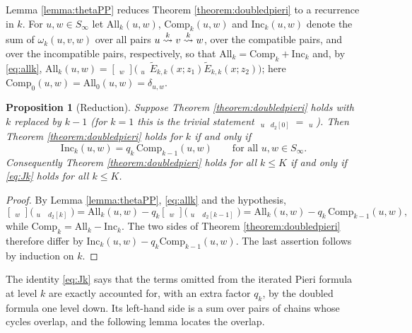 \documentclass{amsart}
\newtheorem{proposition}[lemma]{Proposition}
\theoremstyle{definition}
\theoremstyle{remark}
\numberwithin{equation}{section}
\DeclareMathOperator{\qsch}{\widetilde{\mathfrak{S}}}
\newcommand{\xrightsquigarrow}[2][]{%
	\mathrel{\mathop{\rightsquigarrow}\limits^{\scriptstyle #2}%
	\ifx\hfuzz#1\hfuzz\else_{\scriptstyle #1}\fi}%
}
\newcommand{\tom}[1]{\ensuremath{\xrightsquigarrow{#1}}}
\newcommand{\qelem}{\widetilde{E}}
\begin{document}
Lemma \ref{lemma:thetaPP} reduces Theorem \ref{theorem:doubledpieri} to a recurrence in $k$. For $u,w\in S_\infty$ let $\mathrm{All}_k(u,w)$, $\mathrm{Comp}_k(u,w)$ and $\mathrm{Inc}_k(u,w)$ denote the sum of $\omega_k(u,v,w)$ over all pairs $u\tom{k}v\tom{k}w$, over the compatible pairs, and over the incompatible pairs, respectively, so that $\mathrm{All}_k=\mathrm{Comp}_k+\mathrm{Inc}_k$ and, by \eqref{eq:allk}, $\mathrm{All}_k(u,w)=[\qsch_w]\big(\qsch_u\,\qelem_{k,k}(x;z_1)\qelem_{k,k}(x;z_2)\big)$; here $\mathrm{Comp}_0(u,w)=\mathrm{All}_0(u,w)=\delta_{u,w}$.

\begin{proposition}[Reduction] \label{prop:doubledreduction}
Suppose Theorem \ref{theorem:doubledpieri} holds with $k$ replaced by $k-1$ (for $k=1$ this is the trivial statement $\qsch_u\qsch_{d_2[0]}=\qsch_u$). Then Theorem \ref{theorem:doubledpieri} holds for $k$ if and only if
\begin{equation}\label{eq:Jk}
\mathrm{Inc}_k(u,w)=q_k\,\mathrm{Comp}_{k-1}(u,w)\qquad\text{for all }u,w\in S_\infty.\tag{$\mathrm J_k$}
\end{equation}
Consequently Theorem \ref{theorem:doubledpieri} holds for all $k\leq K$ if and only if \eqref{eq:Jk} holds for all $k\leq K$.
\end{proposition}
\begin{proof}
By Lemma \ref{lemma:thetaPP}, \eqref{eq:allk} and the hypothesis,
$$[\qsch_w]\big(\qsch_u\,\qsch_{d_2[k]}\big)=\mathrm{All}_k(u,w)-q_k[\qsch_w]\big(\qsch_u\,\qsch_{d_2[k-1]}\big)=\mathrm{All}_k(u,w)-q_k\,\mathrm{Comp}_{k-1}(u,w),$$
while $\mathrm{Comp}_k=\mathrm{All}_k-\mathrm{Inc}_k$. The two sides of Theorem \ref{theorem:doubledpieri} therefore differ by $\mathrm{Inc}_k(u,w)-q_k\mathrm{Comp}_{k-1}(u,w)$. The last assertion follows by induction on $k$.
\end{proof}

The identity \eqref{eq:Jk} says that the terms omitted from the iterated Pieri formula at level $k$ are exactly accounted for, with an extra factor $q_k$, by the doubled formula one level down. Its left-hand side is a sum over pairs of chains whose cycles overlap, and the following lemma locates the overlap.
\end{document}
